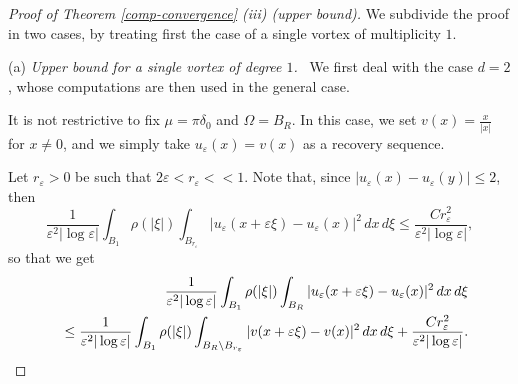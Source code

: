 \documentclass[11pt]{article}
\def\e{\varepsilon}
\begin{document}
\begin{proof}[Proof of Theorem {\rm\ref{comp-convergence}} {\rm (iii)} (upper bound)]
We subdivide the proof in two cases, by treating first the case of a single vortex of multiplicity $1$. 
\smallskip 

\noindent(a) {\em Upper bound for a single vortex of degree $1$.} \
We first deal with the case $d=2$, whose computations are then used in the general case.  

It is not restrictive to fix $\mu=\pi \delta_0$ and $\Omega=B_R$. 
In this case, we set $v(x)=\frac{x}{|x|}$ for $x\neq 0$, and we simply take $u_\e(x)=v(x)$ as a recovery sequence. 

Let $r_\e>0$ be such that 
$2\e<r_\e<<1$. 
Note that, since $|u_\e(x)-u_\e(y)|\leq 2$, then 
\begin{equation*}
\frac{1}{\e^2|\log\e|}\int_{B_1}\rho(|\xi|)\int_{B_{r_\e}} |u_\e(x+\e\xi)-u_\e(x)|^2\, dx \, d\xi\leq \frac{C r_\e^2}{\e^2|\log\e|}, 
\end{equation*}
so that we get  
\begin{eqnarray}\label{uev}
&&\hspace{-1cm}
\frac{1}{\e^2|\log\e|}\int_{B_1}\rho(|\xi|)\int_{B_{R}} |u_\e(x+\e\xi)-u_\e(x)|^2\, dx \, d\xi\nonumber\\
&&\leq \frac{1}{\e^2|\log\e|}\int_{B_1}\rho(|\xi|)\int_{B_{R}\setminus B_{r_\e}} |v(x+\e\xi)-v(x)|^2\, dx \, d\xi+\frac{C r_\e^2}{\e^2|\log\e|}. 
\end{eqnarray}

\bigskip 


\end{proof}
\end{document}
